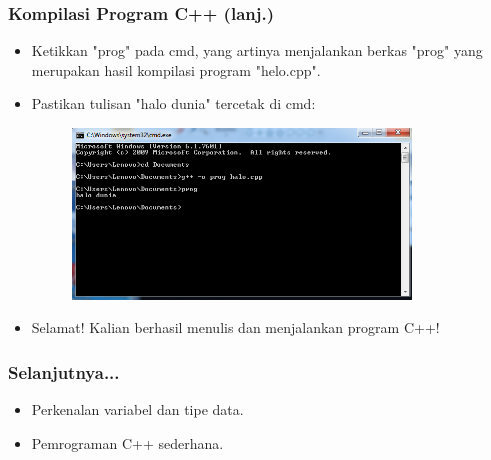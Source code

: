 \begin{frame}
\frametitle{Kompilasi Program C++ (lanj.)}
\begin{itemize}
  \item Ketikkan "prog" pada cmd, yang artinya menjalankan berkas "prog" yang merupakan hasil kompilasi program "helo.cpp".
  \item Pastikan tulisan "halo dunia" tercetak di cmd:
  \begin{figure}
    \includegraphics[width=9cm]{asset/cpp-compile-4.png}
  \end{figure}
  \item Selamat! Kalian berhasil menulis dan menjalankan program C++!
\end{itemize}
\end{frame}

\begin{frame}
\frametitle{Selanjutnya...}
\begin{itemize}
  \item Perkenalan variabel dan tipe data.
  \item Pemrograman C++ sederhana.
\end{itemize}
\end{frame}


